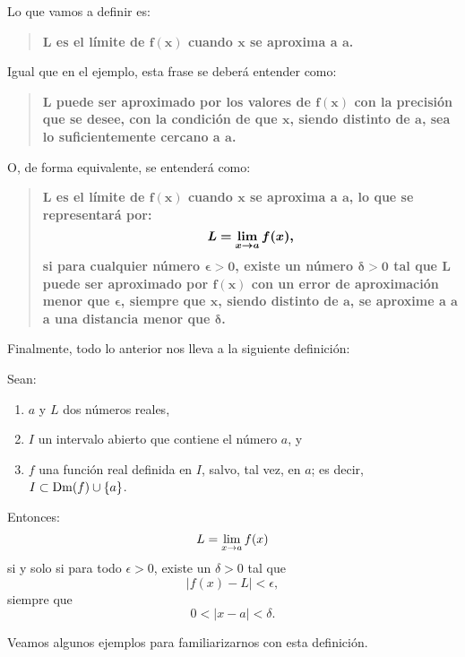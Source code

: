 Lo que vamos a definir es:
\begin{quote}
{\bfseries $\bm{L}$ es el límite de $\bm{f(x)}$ cuando $\bm{x}$ se aproxima a $\bm{a}$.}
\end{quote}
Igual que en el ejemplo, esta frase se deberá entender como:
\begin{quote}
{\bfseries $\bm{L}$ puede ser aproximado por los valores de $\bm{f(x)}$ con la precisión que se
desee, con la condición de que $\bm{x}$, siendo distinto de $\bm{a}$, sea lo suficientemente
cercano a $\bm{a}$.}
\end{quote}
O, de forma equivalente, se entenderá como:
\begin{quote}
{\bfseries $\bm{L}$ es el límite de $\bm{f(x)}$ cuando $\bm{x}$ se aproxima a $\bm{a}$, lo que se
representará por:
\[
\bm{L =} \bm{\limjc{f(x)}{x}{a},}
\]
si para cualquier número $\bm{\epsilon > 0}$, existe un número $\bm{\delta > 0}$ tal que $\bm{L}$
puede ser aproximado por $\bm{f(x)}$ con un error de aproximación menor que $\bm{\epsilon}$,
siempre que $\bm{x}$, siendo distinto de $\bm{a}$, se aproxime a $\bm{a}$ a una distancia menor que
$\bm{\delta}$. }
\end{quote}
Finalmente, todo lo anterior nos lleva a la siguiente definición:

\begin{defical}\label{def:Limite} Sean:
\begin{enumerate}
\item $a$ y $L$ dos números reales,
\item $I$ un intervalo abierto que contiene el número $a$, y
\item $f$ una función real definida en $I$, salvo, tal vez, en $a$; es decir, $I \subset \Dm(f)
    \cup \{a\}$.
\end{enumerate}
Entonces:
\[
L = \limjc{f(x)}{x}{a}
\]
si y solo si para todo $\epsilon > 0$, existe un $\delta > 0$ tal que
\[
|f(x) - L| < \epsilon,
\]
siempre que
\[
0 < |x - a| < \delta.
\]
\end{defical}

Veamos algunos ejemplos para familiarizarnos con esta definición.

